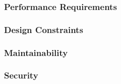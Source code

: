\subsubsection{Performance Requirements}

\subsubsection{Design Constraints}

\subsubsection{Maintainability}

\subsubsection{Security}